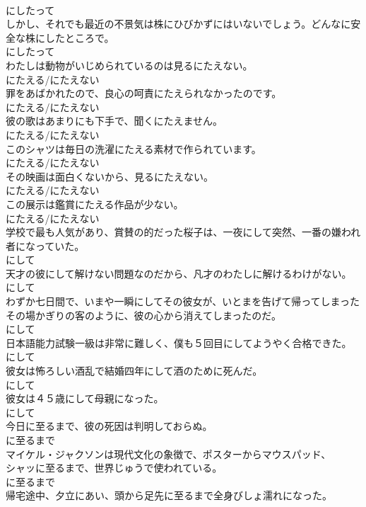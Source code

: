 \documentclass[8pt]{extreport}
\begin{document}
\begin{CJK}{UTF8}{min}
\\	にしたって	
\\	しかし、それでも最近の不景気は株にひびかずにはいないでしょう。どんなに安全な株にしたところで。	
\\	にしたって	
\\	わたしは動物がいじめられているのは見るにたえない。	
\\	にたえる/にたえない	
\\	罪をあばかれたので、良心の呵責にたえられなかったのです。	
\\	にたえる/にたえない	
\\	彼の歌はあまりにも下手で、聞くにたえません。	
\\	にたえる/にたえない	
\\	このシャツは毎日の洗濯にたえる素材で作られています。	
\\	にたえる/にたえない	
\\	その映画は面白くないから、見るにたえない。	
\\	にたえる/にたえない	
\\	この展示は鑑賞にたえる作品が少ない。	
\\	にたえる/にたえない	
\\	学校で最も人気があり、賞賛の的だった桜子は、一夜にして突然、一番の嫌われ者になっていた。	
\\	にして	
\\	天才の彼にして解けない問題なのだから、凡才のわたしに解けるわけがない。	
\\	にして	
\\	わずか七日間で、いまや一瞬にしてその彼女が、いとまを告げて帰ってしまったその場かぎりの客のように、彼の心から消えてしまったのだ。	
\\	にして	
\\	日本語能力試験一級は非常に難しく、僕も５回目にしてようやく合格できた。	
\\	にして	
\\	彼女は怖ろしい酒乱で結婚四年にして酒のために死んだ。	
\\	にして	
\\	彼女は４５歳にして母親になった。	
\\	にして	
\\	今日に至るまで、彼の死因は判明しておらぬ。	
\\	に至るまで	
\\	マイケル・ジャクソンは現代文化の象徴で、ポスターからマウスパッド、
\\	シャッに至るまで、世界じゅうで使われている。	
\\	に至るまで	
\\	帰宅途中、夕立にあい、頭から足先に至るまで全身びしょ濡れになった。	

\end{CJK}
\end{document}
